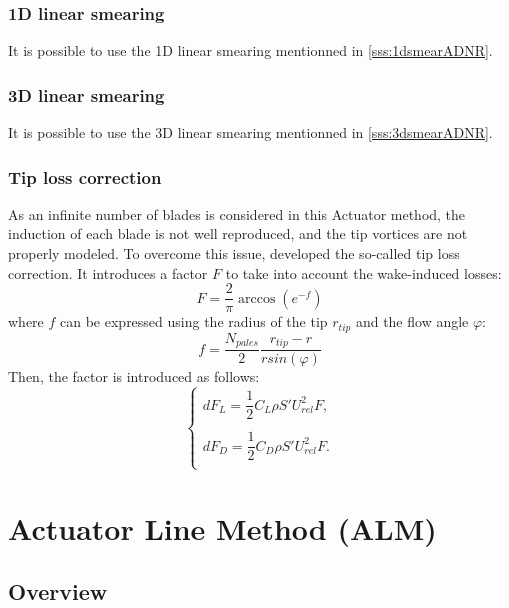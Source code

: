 \subsubsection*{1D linear smearing}
It is possible to use the 1D linear smearing mentionned in \ref{sss:1dsmearADNR}.

\subsubsection*{3D linear smearing}
It is possible to use the 3D linear smearing mentionned in \ref{sss:3dsmearADNR}.

\subsubsection*{Tip loss correction}
\label{sss:tiplossADR}
As an infinite number of blades is considered in this Actuator method, the induction of each blade is not well reproduced, and the tip vortices are not properly modeled. To overcome this issue, \citet{glauert1935airplane} developed the so-called tip loss correction. It introduces a factor $F$ to take into account the wake-induced losses:
\begin{equation}
F = \dfrac{2}{\pi} \arccos( e^{-f})
\end{equation}
where $f$ can be expressed using the radius of the tip $r_{tip}$ and the flow angle $\varphi$:
\begin{equation}
f=
\dfrac{N_{pales}}{2} \dfrac{r_{tip}-r}{r sin(\varphi)}
\end{equation}
Then, the factor is introduced as follows:
\begin{equation}	
\label{eq:ADR_tiploss}
\left\lbrace
\begin{array}{ccc}	
dF_{L} = \dfrac{1}{2} C_L \rho S' U_{rel}^2 F,
\\   
\\
dF_{D} = \dfrac{1}{2} C_D \rho S' U_{rel}^2 F.
\\
\end{array}\right.
\end{equation}	

\section{Actuator Line Method (ALM)}
\subsection{Overview}

